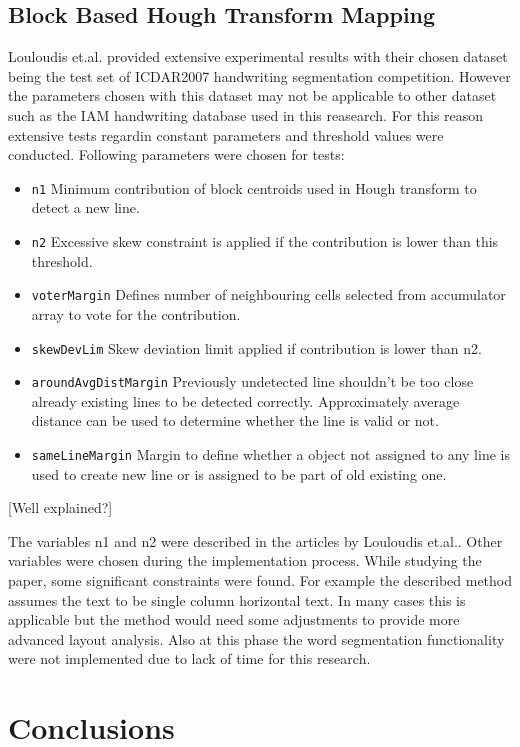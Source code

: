 \documentclass{article}
\def\code#1{\texttt{#1}}
\begin{document}
    \subsection{Block Based Hough Transform Mapping}
      Louloudis et.al. provided extensive experimental results with their chosen dataset being the test set of ICDAR2007 handwriting segmentation competition. However the parameters chosen with this dataset may not be applicable to other dataset such as the IAM handwriting database used in this reasearch. For this reason extensive tests regardin constant parameters and threshold values were conducted. Following parameters were chosen for tests:
      \begin{itemize}
        \item \code{n1} Minimum contribution of block centroids used in Hough transform to detect a new line.
        \item \code{n2} Excessive skew constraint is applied if the contribution is lower than this threshold.
        \item \code{voterMargin} Defines number of neighbouring cells selected from accumulator array to vote for the contribution.
        \item \code{skewDevLim} Skew deviation limit applied if contribution is lower than n2.
        \item \code{aroundAvgDistMargin} Previously undetected line shouldn't be too close already existing lines to be detected correctly. Approximately average distance can be used to determine whether the line is valid or not.
        \item \code{sameLineMargin} Margin to define whether a object not assigned to any line is used to create new line or is assigned to be part of old existing one.
      \end{itemize}


      {\color{red}[Well explained?]}


    The variables n1 and n2 were described in the articles by Louloudis et.al.. Other variables were chosen during the implementation process. While studying the paper, some significant constraints were found. For example the described method assumes the text to be single column horizontal text. In many cases this is applicable but the method would need some adjustments to provide more advanced layout analysis. Also at this phase the word segmentation functionality were not implemented due to lack of time for this research.


  \newpage
  \section{Conclusions}

  \newpage
  
  
\end{document}
